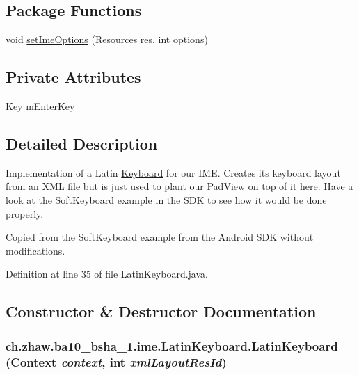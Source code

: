 \subsection*{Package Functions}
\begin{DoxyCompactItemize}
\item 
void \hyperlink{classch_1_1zhaw_1_1ba10__bsha__1_1_1ime_1_1LatinKeyboard_adf5bb7364614b740d3360ed911912f31}{setImeOptions} (Resources res, int options)
\end{DoxyCompactItemize}
\subsection*{Private Attributes}
\begin{DoxyCompactItemize}
\item 
Key \hyperlink{classch_1_1zhaw_1_1ba10__bsha__1_1_1ime_1_1LatinKeyboard_ad656281b2f3876c565a1b8d5ec514fe4}{mEnterKey}
\end{DoxyCompactItemize}


\subsection{Detailed Description}
Implementation of a Latin \hyperlink{}{Keyboard} for our IME. Creates its keyboard layout from an XML file but is just used to plant our \hyperlink{classch_1_1zhaw_1_1ba10__bsha__1_1_1ime_1_1PadView}{PadView} on top of it here. Have a look at the SoftKeyboard example in the SDK to see how it would be done properly.

Copied from the SoftKeyboard example from the Android SDK without modifications. 

Definition at line 35 of file LatinKeyboard.java.

\subsection{Constructor \& Destructor Documentation}
\hypertarget{classch_1_1zhaw_1_1ba10__bsha__1_1_1ime_1_1LatinKeyboard_acc26ef16ae49f4b555f375e831b322c0}{
\subsubsection[{LatinKeyboard}]{\setlength{\rightskip}{0pt plus 5cm}ch.zhaw.ba10\_\-bsha\_\-1.ime.LatinKeyboard.LatinKeyboard (Context {\em context}, \/  int {\em xmlLayoutResId})}}
\label{classch_1_1zhaw_1_1ba10__bsha__1_1_1ime_1_1LatinKeyboard_acc26ef16ae49f4b555f375e831b322c0}


